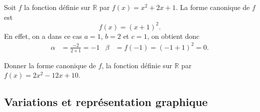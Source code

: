 \documentclass[11pt]{article}
\begin{document}
\begin{exemple}
  Soit $f$ la fonction définie sur $\mathbb{R}$ par $f(x) = x^2 + 2x + 1$.
  La forme canonique de $f$ est 
  \[
    f(x) = (x+1)^2.
  \]
  En effet, on a dans ce cas $a=1$, $b=2$ et $c=1$, on obtient donc
  \begin{align*}
    \alpha &= \frac{-2}{2\times1} = -1 &
    \beta &= f(-1) = (-1+1)^2 = 0.
  \end{align*}
\end{exemple}

\begin{app}
  Donner la forme canonique de $f$, la fonction définie sur $\mathbb{R}$ par
  $f(x) = 2x^2-12x+10$.
\end{app}

\subsection{Variations et représentation graphique}
\end{document}
